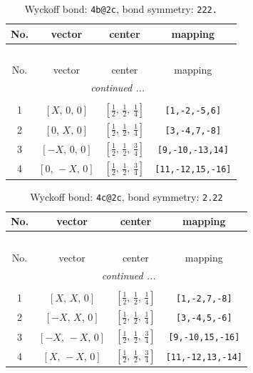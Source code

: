 \documentclass[fleqn,8pt]{jsarticle}
\begin{document}
\renewcommand{\arraystretch}{1.2}
\begin{longtable}{cccc}
\caption{Wyckoff bond: {\tt 4b@2c}, bond symmetry: {\tt 222.}}
 \\
 \hline \hline
No. & vector & center & mapping \\ \hline \endfirsthead

\multicolumn{3}{l}{\tablename\ \thetable{}} \\
 \hline \hline
No. & vector & center & mapping \\ \hline \endhead

 \hline \hline
\multicolumn{3}{r}{\footnotesize\it continued ...} \\ \endfoot

 \hline \hline
\multicolumn{3}{r}{} \\ \endlastfoot

1 & $\left[ X,\, 0,\, 0 \right]$ & $\left[ \frac{1}{2},\, \frac{1}{2},\, \frac{1}{4} \right]$ & {\tt [1,-2,-5,6]} \\ \hline
2 & $\left[ 0,\, X,\, 0 \right]$ & $\left[ \frac{1}{2},\, \frac{1}{2},\, \frac{1}{4} \right]$ & {\tt [3,-4,7,-8]} \\ \hline
3 & $\left[ - X,\, 0,\, 0 \right]$ & $\left[ \frac{1}{2},\, \frac{1}{2},\, \frac{3}{4} \right]$ & {\tt [9,-10,-13,14]} \\ \hline
4 & $\left[ 0,\, - X,\, 0 \right]$ & $\left[ \frac{1}{2},\, \frac{1}{2},\, \frac{3}{4} \right]$ & {\tt [11,-12,15,-16]} \\
\end{longtable}
\renewcommand{\arraystretch}{1.2}
\begin{longtable}{cccc}
\caption{Wyckoff bond: {\tt 4c@2c}, bond symmetry: {\tt 2.22}}
 \\
 \hline \hline
No. & vector & center & mapping \\ \hline \endfirsthead

\multicolumn{3}{l}{\tablename\ \thetable{}} \\
 \hline \hline
No. & vector & center & mapping \\ \hline \endhead

 \hline \hline
\multicolumn{3}{r}{\footnotesize\it continued ...} \\ \endfoot

 \hline \hline
\multicolumn{3}{r}{} \\ \endlastfoot

1 & $\left[ X,\, X,\, 0 \right]$ & $\left[ \frac{1}{2},\, \frac{1}{2},\, \frac{1}{4} \right]$ & {\tt [1,-2,7,-8]} \\ \hline
2 & $\left[ - X,\, X,\, 0 \right]$ & $\left[ \frac{1}{2},\, \frac{1}{2},\, \frac{1}{4} \right]$ & {\tt [3,-4,5,-6]} \\ \hline
3 & $\left[ - X,\, - X,\, 0 \right]$ & $\left[ \frac{1}{2},\, \frac{1}{2},\, \frac{3}{4} \right]$ & {\tt [9,-10,15,-16]} \\ \hline
4 & $\left[ X,\, - X,\, 0 \right]$ & $\left[ \frac{1}{2},\, \frac{1}{2},\, \frac{3}{4} \right]$ & {\tt [11,-12,13,-14]} \\
\end{longtable}
\end{document}
